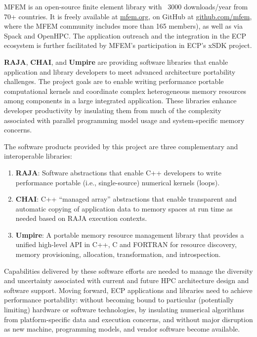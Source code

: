 MFEM is an open-source finite element library with ~3000 downloads/year from 70+
countries. It is freely available at \url{mfem.org}, on GitHub
at \url{github.com/mfem}, where the MFEM community includes more than 165
members), as well as via Spack and OpenHPC. The application outreach and the
integration in the ECP ecosystem is further facilitated by MFEM's participation
in ECP's xSDK project.

\textbf{RAJA}, \textbf{CHAI}, and \textbf{Umpire} are providing software libraries that enable
application and library developers to meet advanced architecture
portability challenges. The project goals are to enable writing
performance portable computational kernels and coordinate complex
heterogeneous memory resources among components in a large integrated
application. These libraries enhance developer productivity by insulating
them from much of the complexity associated with parallel programming
model usage and system-specific memory concerns.

The software products provided by this project are three complementary
and interoperable libraries:

\begin{enumerate}

\item {\bf RAJA}: Software abstractions that enable C++ developers to write
    performance portable (i.e., single-source) numerical kernels (loops).

\item {\bf CHAI}: C++ ``managed array'' abstractions that enable transparent
    and automatic copying of application data to memory spaces at run
    time as needed based on RAJA execution contexts.

\item {\bf Umpire}: A portable memory resource management library that provides
    a unified high-level API in C++, C and FORTRAN for resource
    discovery, memory provisioning, allocation, transformation, and
    introspection.

\end{enumerate}

Capabilities delivered by these software efforts are needed to manage the
diversity and uncertainty associated with current and future HPC
architecture design and software support. Moving forward, ECP
applications and libraries need to achieve performance portability:
without becoming bound to particular (potentially limiting) hardware or
software technologies, by insulating numerical algorithms from
platform-specific data and execution concerns, and without major
disruption as new machine, programming models, and vendor software become
available.

